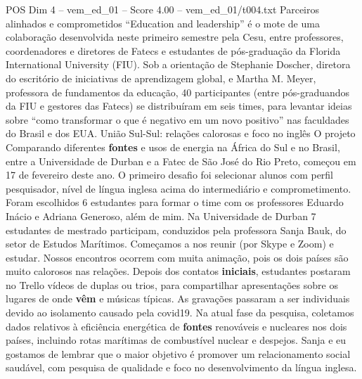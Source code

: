 \begin{textsample}{POS Dim 4 – vem\_ed\_01 – Score 4.00 – vem\_ed\_01/t004.txt}  \label{ex:f4_pos_017}
Parceiros alinhados e comprometidos “Education and leadership” é o mote de uma colaboração desenvolvida neste primeiro semestre pela Cesu, entre professores, coordenadores e diretores de Fatecs e estudantes de pós-graduação da Florida International University (FIU).
Sob a orientação de Stephanie Doscher, diretora do escritório de iniciativas de aprendizagem global, e Martha M.
Meyer, professora de fundamentos da educação, 40 participantes (entre pós-graduandos da FIU e gestores das Fatecs) se distribuíram em seis times, para levantar ideias sobre “como transformar o que é negativo em um novo positivo” nas faculdades do Brasil e dos EUA.
União Sul-Sul: relações calorosas e foco no inglês O projeto Comparando diferentes \textbf{fontes} e usos de energia na África do Sul e no Brasil, entre a Universidade de Durban e a Fatec de São José do Rio Preto, começou em 17 de fevereiro deste ano.
O primeiro desafio foi selecionar alunos com perfil pesquisador, nível de língua inglesa acima do intermediário e comprometimento.
Foram escolhidos 6 estudantes para formar o time com os professores Eduardo Inácio e Adriana Generoso, além de mim.
Na Universidade de Durban 7 estudantes de mestrado participam, conduzidos pela professora Sanja Bauk, do setor de Estudos Marítimos.
Começamos a nos reunir (por Skype e Zoom) e estudar.
Nossos encontros ocorrem com muita animação, pois os dois países são muito calorosos nas relações.
Depois dos contatos \textbf{iniciais}, estudantes postaram no Trello vídeos de duplas ou trios, para compartilhar apresentações sobre os lugares de onde \textbf{vêm} e músicas típicas.
As gravações passaram a ser individuais devido ao isolamento causado pela covid19.
Na atual fase da pesquisa, coletamos dados relativos à eficiência energética de \textbf{fontes} renováveis e nucleares nos dois países, incluindo rotas marítimas de combustível nuclear e despejos.
Sanja e eu gostamos de lembrar que o maior objetivo é promover um relacionamento social saudável, com pesquisa de qualidade e foco no desenvolvimento da língua inglesa.

\end{textsample}
